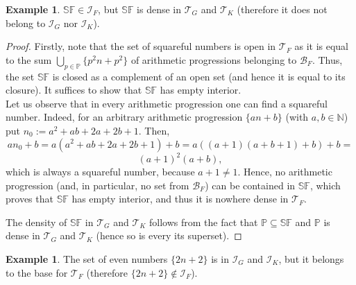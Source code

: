 \documentclass{amsart}
\theoremstyle{definition}
\newtheorem{ex}[thm]{Example}
\newcommand{\N}{{\mathbb N}}
\newcommand{\I}{\mathcal I}
\newcommand{\T}{\mathcal{T}}
\newcommand{\B}{\mathcal{B}}
\newcommand{\SqrFr}{\mathbb{SF}}
\begin{document}
\begin{ex} 
$\SqrFr\in \I_F$, but $\SqrFr$ is dense in $\T_G$ and $\T_K$ (therefore it does not belong to $\I_G$ nor $\I_K$).
\end{ex}

\begin{proof}
Firstly, note that the set of squareful numbers is open in $\T_F$ as it is equal to the sum $\bigcup_{p\in\mathbb{P}}{\{p^2 n+p^2\}}$ of arithmetic progressions belonging to $\B_F$. Thus, the set $\SqrFr$ is closed as a complement of an open set (and hence it is equal to its closure). It suffices to show that $\SqrFr$ has empty interior.\\
Let us observe that in every arithmetic progression one can find a squareful number. Indeed, for an arbitrary arithmetic progression $\{an+b\}$ (with $a,b\in\N$) put $n_0 := a^2 +ab+2a+2b+1$. 
Then,
$$an_0 +b = a(a^2 +ab+2a+2b+1)+b = a((a+1)(a+b+1)+b)+b = $$
$$ (a+1)^2 (a+b),$$
which is always a squareful number, because $a+1  \neq 1$. Hence, no arithmetic progression (and, in particular, no set from $\B_F$) can be contained in $\SqrFr$, which proves that $\SqrFr$ has empty interior, and thus it is nowhere dense in $\T_F$.

The density of $\SqrFr$ in $\T_G$ and $\T_K$ follows from the fact that $\mathbb{P}\subseteq \SqrFr$ and $\mathbb{P}$ is dense in $\T_G$ and $\T_K$ (hence so is every its superset).
\end{proof}

\begin{ex} \label{even}
The set of even numbers $\{2n+2\}$ is in $\I_G$ and $\I_K$, but it belongs to the base for $\T_F$ (therefore $\{2n+2\}\notin \I_F$).
\end{ex}
\end{document}
